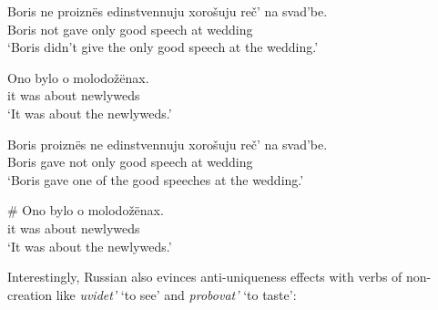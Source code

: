 \begin{exe}
	\ex \begin{xlist}
		\ex \gll Boris ne proizn\"{e}s edinstvennuju xoro\v{s}uju re\v{c}' na svad'be.\\
		Boris not gave only good speech at wedding\\
		\glt `Boris didn't give the only good speech at the wedding.'

		\ex \gll Ono bylo o molodo\v{z}\"{e}nax.\\
		it was about newlyweds\\
		\glt `It was about the newlyweds.'
	\end{xlist}

	\ex \label{boris3} \begin{xlist}
		\ex \gll Boris proizn\"{e}s ne edinstvennuju xoro\v{s}uju re\v{c}' na svad'be.\\
		Boris gave not only good speech at wedding\\
		\glt `Boris gave one of the good speeches at the wedding.'

		\ex \gll \# Ono bylo o molodo\v{z}\"{e}nax.\\
		{} it was about newlyweds\\
		\glt `It was about the newlyweds.'
	\end{xlist}
\end{exe}

Interestingly, Russian also evinces anti-uniqueness effects with verbs of non-creation like \textit{uvidet'} `to see' and \textit{probovat'} `to taste':

